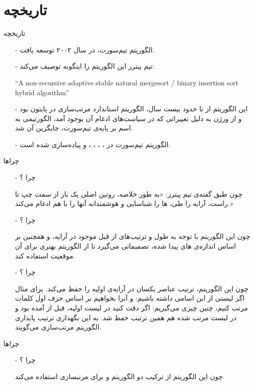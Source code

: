 \section{تاریخچه}
\begin{frame}{تاریخچه}
\begin{itemize}\itemr
\item[-]
الگوریتم تیم‌سورت، در سال ۲۰۰۲ توسعه یافت.

\item[-]
تیم‌ پیترز این الگوریتم را اینگونه توصیف می‌کند:
\begin{flushleft}
\begin{latin}
``A non-recursive adaptive stable natural mergesort / binary insertion sort hybrid algorithm''
\end{latin}
\end{flushleft}

\item[-]
این الگوریتم از 
تا حدود بیست سال، الگوریتم استاندارد مرتب‌سازی در پایتون بود و از ورژن 
به دلیل تغییراتی که در سیاست‌های ادغام آن بوجود آمد، الگورتیمی به اسم 
بر پایه‌ی تیم‌سورت، جایگزین آن شد.

\item[-]
الگوریتم تیم‌سورت در 
،
،
،
،
 و 
پیاده‌سازی شده است.
\end{itemize}
\end{frame}

\begin{frame}{چراها}
\begin{itemize}\itemr
\item[-]
چرا ؟

چون طبق گفته‌ی تیم پیترز: «به طور خلاصه، روتین اصلی یک بار از سمت چپ تا راست، آرایه را طی، ‌ها را شناسایی و هوشمندانه‌ آنها را با هم ادغام می‌کند.»

\item[-]
چرا ؟

چون این الگوریتم با توجه به طول و ترتیب‌های از قبل موجود در آرایه، و همچنین بر اساس اندازه‌‌ی 
های
پیدا شده، تصمیماتی می‌گیرد تا از الگوریتم بهتری برای آن موقعیت استفاده کند.

\item[-]
چرا ؟

چون این الگوریتم، ترتیب عناصر یکسان در آرایه‌ی اولیه را حفظ می‌کند. برای مثال اگر لیستی از این اسامی داشته باشیم: 
و آنرا بخواهیم بر اساس حرف اول کلمات مرتب کنیم، چنین چیزی می‌گیریم:
اگر دقت کنید در لیست اولیه،  قبل از  آمده بود و در لیست مرتب شده هم همین ترتیب حفظ شد. به این نگهداری ترتیب پایداری الگوریتم مرتب‌سازی می‌گویند.
\end{itemize}
\end{frame}

\begin{frame}{چراها}
\begin{itemize}\itemr
\item[-]
چرا ؟

چون این الگوریتم از ترکیب دو الگوریتم 
و
برای مرتبسازی استفاده می‌کند.
\end{itemize}
\end{frame}